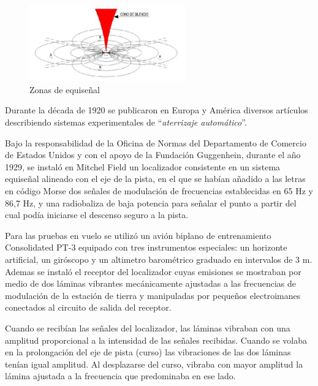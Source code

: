 \begin{figure}[!h]
  \centering
  \includegraphics[width = 0.6\textwidth]{06.radionavegacion/Imagenes/06.Sistemas.Aproximacion/06_ils_zonasEquisenial.png}
    \caption{Zonas de equiseñal}
  \label{fig:06.ILS.zonas.equisenial}
\end{figure}

Durante la década de 1920 se publicaron en  Europa y América diversos artículos  describiendo sistemas experimentales de ``\emph{aterrizaje automático}''.


Bajo la responsabilidad de la Oficina de Normas del Departamento de Comercio de Estados
Unidos y con el apoyo de la Fundación Guggenhein, durante el año 1929, se instaló en Mitchel Field
un localizador consistente en un sistema equiseñal alineado con el eje de la pista, en el que se habían
añadido a las letras en código Morse dos señales de modulación de frecuencias establecidas en 65 Hz
y 86,7 Hz, y una radiobaliza de baja potencia para señalar el punto a partir del cual podía iniciarse
el descenso seguro a la pista.

Para las pruebas en vuelo se utilizó un avión biplano de entrenamiento Consolidated PT-3 equipado con tres instrumentos especiales: un horizonte artificial, un giróscopo y un altimetro barométrico graduado en intervalos de 3 m. Ademas se instaló el receptor del localizador cuyas emisiones se mostraban por medio de dos láminas vibrantes mecánicamente ajustadas a las frecuencias de modulación de la estación de tierra y manipuladas por pequeños electroimanes conectados al circuito de salida del receptor.

Cuando se recibían las señales del localizador, las láminas vibraban con una amplitud proporcional a la intensidad de las señales recibidas. Cuando se volaba en la prolongación del eje de pista
(curso) las vibraciones de las dos láminas tenían igual amplitud. Al desplazarse del curso, vibraba
con mayor amplitud la lámina ajustada a la frecuencia que predominaba en ese lado.

